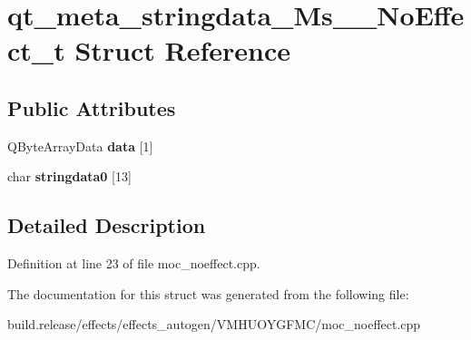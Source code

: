 \hypertarget{structqt__meta__stringdata___ms_____no_effect__t}{}\section{qt\+\_\+meta\+\_\+stringdata\+\_\+\+Ms\+\_\+\+\_\+\+No\+Effect\+\_\+t Struct Reference}
\label{structqt__meta__stringdata___ms_____no_effect__t}
\subsection*{Public Attributes}
\begin{DoxyCompactItemize}
\item 
\mbox{\label{structqt__meta__stringdata___ms_____no_effect__t_ad3847aa93b4bbdf64a67d6d87c6b8cd1}} 
Q\+Byte\+Array\+Data {\bfseries data} \mbox{[}1\mbox{]}
\item 
\mbox{\label{structqt__meta__stringdata___ms_____no_effect__t_a9b87e5fb0d52e4085d95c28849a7047c}} 
char {\bfseries stringdata0} \mbox{[}13\mbox{]}
\end{DoxyCompactItemize}


\subsection{Detailed Description}


Definition at line 23 of file moc\+\_\+noeffect.\+cpp.



The documentation for this struct was generated from the following file\+:\begin{DoxyCompactItemize}
\item 
build.\+release/effects/effects\+\_\+autogen/\+V\+M\+H\+U\+O\+Y\+G\+F\+M\+C/moc\+\_\+noeffect.\+cpp\end{DoxyCompactItemize}
